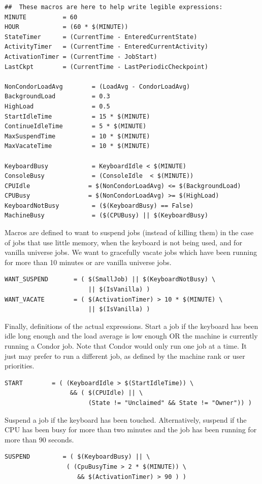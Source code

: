\begin{verbatim}
##  These macros are here to help write legible expressions:
MINUTE          = 60
HOUR            = (60 * $(MINUTE))
StateTimer      = (CurrentTime - EnteredCurrentState)
ActivityTimer   = (CurrentTime - EnteredCurrentActivity)
ActivationTimer = (CurrentTime - JobStart)
LastCkpt        = (CurrentTime - LastPeriodicCheckpoint)

NonCondorLoadAvg        = (LoadAvg - CondorLoadAvg)
BackgroundLoad          = 0.3
HighLoad                = 0.5
StartIdleTime           = 15 * $(MINUTE)
ContinueIdleTime        = 5 * $(MINUTE)
MaxSuspendTime          = 10 * $(MINUTE)
MaxVacateTime           = 10 * $(MINUTE)

KeyboardBusy            = KeyboardIdle < $(MINUTE)
ConsoleBusy             = (ConsoleIdle  < $(MINUTE))
CPUIdle                = $(NonCondorLoadAvg) <= $(BackgroundLoad)
CPUBusy                = $(NonCondorLoadAvg) >= $(HighLoad)
KeyboardNotBusy         = ($(KeyboardBusy) == False)
MachineBusy             = ($(CPUBusy) || $(KeyboardBusy)
\end{verbatim}

Macros are defined to want to suspend jobs (instead of
killing them) in the case of jobs that use little memory,
when the keyboard is not being used, and for vanilla universe
jobs.
We want to gracefully vacate jobs which
have been running for more than 10 minutes
or are vanilla universe jobs.
\begin{verbatim}
WANT_SUSPEND       = ( $(SmallJob) || $(KeyboardNotBusy) \
                       || $(IsVanilla) )
WANT_VACATE        = ( $(ActivationTimer) > 10 * $(MINUTE) \
                       || $(IsVanilla) )
\end{verbatim}

Finally, definitions of the actual expressions.
Start a job if 
the keyboard has been idle long enough and
the load average is low enough OR the machine is currently
running a Condor job.
Note that Condor would only run one job at a time.
It just may prefer to run a different job, as defined by
the machine rank or user priorities.
\begin{verbatim}
START        = ( (KeyboardIdle > $(StartIdleTime)) \
                  && ( $(CPUIdle) || \
                       (State != "Unclaimed" && State != "Owner")) )
\end{verbatim}

Suspend a job if the keyboard has been touched.
Alternatively, suspend if the CPU has been busy for more than two minutes
and the job has been running for more than 90 seconds.
\begin{verbatim}
SUSPEND         = ( $(KeyboardBusy) || \
                 ( (CpuBusyTime > 2 * $(MINUTE)) \
                    && $(ActivationTimer) > 90 ) )
\end{verbatim}

